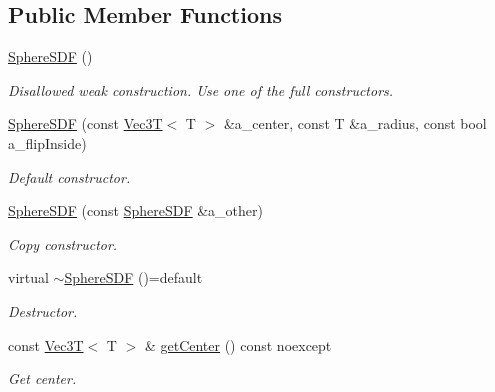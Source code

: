 \subsection*{Public Member Functions}
\begin{DoxyCompactItemize}
\item 
\mbox{\label{classSphereSDF_a87b40869b91424d85692216a3268289b}} 
\hyperlink{classSphereSDF_a87b40869b91424d85692216a3268289b}{Sphere\+S\+DF} ()
\begin{DoxyCompactList}\small\item\em Disallowed weak construction. Use one of the full constructors. \end{DoxyCompactList}\item 
\hyperlink{classSphereSDF_a3e555062b1b20c1729a9f4ab6136add4}{Sphere\+S\+DF} (const \hyperlink{classVec3T}{Vec3T}$<$ T $>$ \&a\+\_\+center, const T \&a\+\_\+radius, const bool a\+\_\+flip\+Inside)
\begin{DoxyCompactList}\small\item\em Default constructor. \end{DoxyCompactList}\item 
\mbox{\label{classSphereSDF_a2c25f14a19fcb910cd4d48af7123185a}} 
\hyperlink{classSphereSDF_a2c25f14a19fcb910cd4d48af7123185a}{Sphere\+S\+DF} (const \hyperlink{classSphereSDF}{Sphere\+S\+DF} \&a\+\_\+other)
\begin{DoxyCompactList}\small\item\em Copy constructor. \end{DoxyCompactList}\item 
\mbox{\label{classSphereSDF_ab5980286d17bb9da7425b4d9d4045850}} 
virtual \hyperlink{classSphereSDF_ab5980286d17bb9da7425b4d9d4045850}{$\sim$\+Sphere\+S\+DF} ()=default
\begin{DoxyCompactList}\small\item\em Destructor. \end{DoxyCompactList}\item 
\mbox{\label{classSphereSDF_a82922ae162a9b96279cc4d0d866b303d}} 
const \hyperlink{classVec3T}{Vec3T}$<$ T $>$ \& \hyperlink{classSphereSDF_a82922ae162a9b96279cc4d0d866b303d}{get\+Center} () const noexcept
\begin{DoxyCompactList}\small\item\em Get center. \end{DoxyCompactList}\item 

\end{DoxyCompactItemize}
